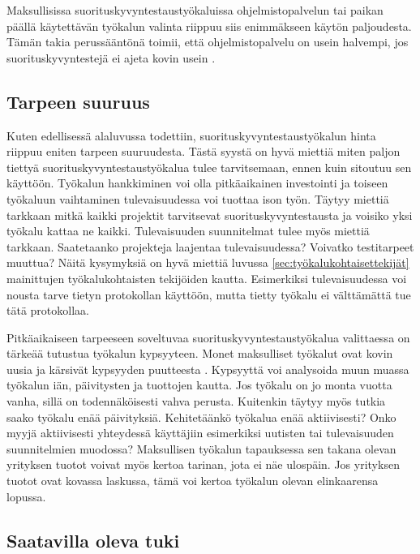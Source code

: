 Maksullisissa suorituskyvyntestaustyökaluissa ohjelmistopalvelun tai paikan päällä käytettävän työkalun valinta riippuu siis enimmäkseen käytön paljoudesta. Tämän takia perussääntönä toimii, että ohjelmistopalvelu on usein halvempi, jos suorituskyvyntestejä ei ajeta kovin usein \parencite[16]{TheArtOfApplication}.



\subsection{Tarpeen suuruus}
\label{ssec:tarpeensuuruus}
Kuten edellisessä alaluvussa todettiin, suorituskyvyntestaustyökalun hinta riippuu eniten tarpeen suuruudesta. Tästä syystä on hyvä miettiä miten paljon tiettyä suorituskyvyntestaustyökalua tulee tarvitsemaan, ennen kuin sitoutuu sen käyttöön. Työkalun hankkiminen voi olla pitkäaikainen investointi ja toiseen työkaluun vaihtaminen tulevaisuudessa voi tuottaa ison työn. Täytyy miettiä tarkkaan mitkä kaikki projektit tarvitsevat suorituskyvyntestausta ja voisiko yksi työkalu kattaa ne kaikki. Tulevaisuuden suunnitelmat tulee myös miettiä tarkkaan. Saatetaanko projekteja laajentaa tulevaisuudessa? Voivatko testitarpeet muuttua? Näitä kysymyksiä on hyvä miettiä luvussa \ref{sec:työkalukohtaisettekijät} mainittujen työkalukohtaisten tekijöiden kautta. Esimerkiksi tulevaisuudessa voi nousta tarve tietyn protokollan käyttöön, mutta tietty työkalu ei välttämättä tue tätä protokollaa.

Pitkäaikaiseen tarpeeseen soveltuvaa suorituskyvyntestaustyökalua valittaessa on tärkeää tutustua työkalun kypsyyteen. Monet maksulliset työkalut ovat kovin uusia ja kärsivät kypsyyden puutteesta \parencite{ComparativeAnalysisOfWeb}. Kypsyyttä voi analysoida muun muassa työkalun iän, päivitysten ja tuottojen kautta. Jos työkalu on jo monta vuotta vanha, sillä on todennäköisesti vahva perusta. Kuitenkin täytyy myös tutkia saako työkalu enää päivityksiä. Kehitetäänkö työkalua enää aktiivisesti? Onko myyjä aktiivisesti yhteydessä käyttäjiin esimerkiksi uutisten tai tulevaisuuden suunnitelmien muodossa? Maksullisen työkalun tapauksessa sen takana olevan yrityksen tuotot voivat myös kertoa tarinan, jota ei näe ulospäin. Jos yrityksen tuotot ovat kovassa laskussa, tämä voi kertoa työkalun olevan elinkaarensa lopussa.


\subsection{Saatavilla oleva tuki}
\label{ssec:tuki}

